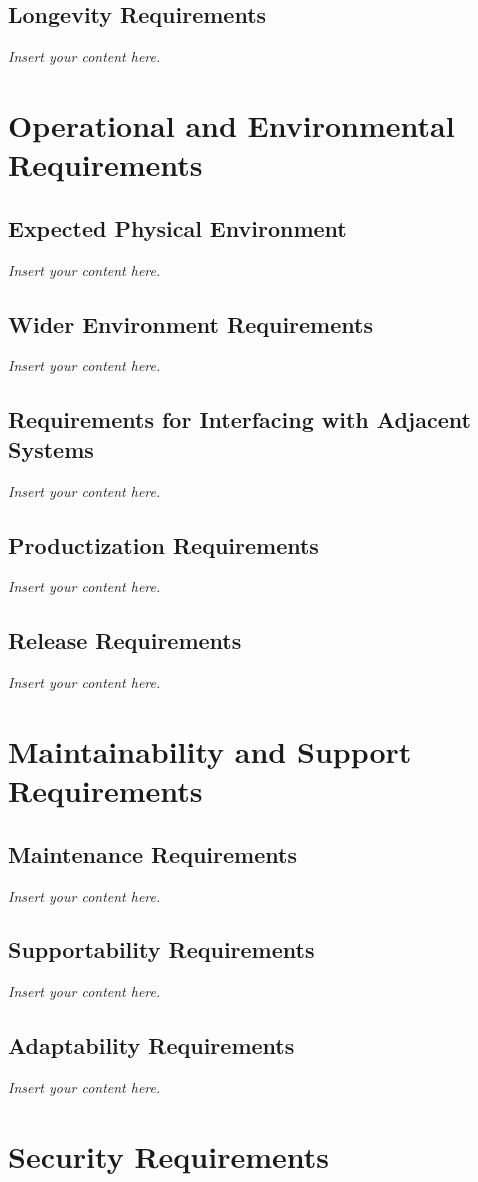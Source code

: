 \documentclass[12pt]{article}
\newcommand{\lips}{\textit{Insert your content here.}}
\begin{document}
\subsection{Longevity Requirements}
\lips

\section{Operational and Environmental Requirements}
\subsection{Expected Physical Environment}
\lips
\subsection{Wider Environment Requirements}
\lips
\subsection{Requirements for Interfacing with Adjacent Systems}
\lips
\subsection{Productization Requirements}
\lips
\subsection{Release Requirements}
\lips

\section{Maintainability and Support Requirements}
\subsection{Maintenance Requirements}
\lips
\subsection{Supportability Requirements}
\lips
\subsection{Adaptability Requirements}
\lips

\section{Security Requirements}
\end{document}
